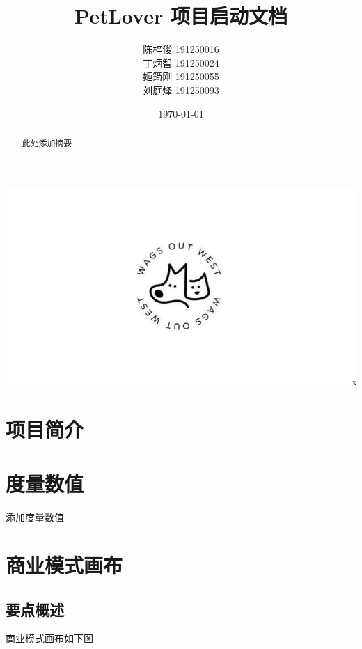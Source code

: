 \documentclass[a4paper]{ctexart}
\title{\Huge PetLover 项目启动文档}
\author{
  陈梓俊 191250016\\
  丁炳智 191250024\\
  姬筠刚 191250055\\
  刘庭烽 191250093\\
}
\date{\today}
\begin{document}
\maketitle

\centerline{\includegraphics[]{logo.jpg}}

\newpage

\begin{abstract}
  此处添加摘要
\end{abstract}



\tableofcontents

\newpage

\setlength{\parskip}{1em}


\section{项目简介}



\section{度量数值}

添加度量数值

\section{商业模式画布}

\subsection{要点概述}

商业模式画布如下图
\end{document}
